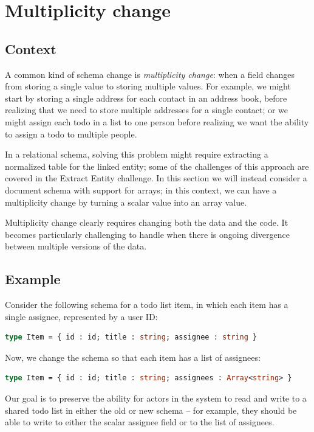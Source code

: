 \documentclass[english,submission]{programming}
\begin{document}
\section{Multiplicity change}

\subsection{Context}

A common kind of schema change is \textit{multiplicity change}: when a field changes from storing a single value to storing multiple values. For example, we might start by storing a single address for each contact in an address book, before realizing that we need to store multiple addresses for a single contact; or we might assign each todo in a list to one person before realizing we want the ability to assign a todo to multiple people.

In a relational schema, solving this problem might require extracting a normalized table for the linked entity; some of the challenges of this approach are covered in the Extract Entity challenge. In this section we will instead consider a document schema with support for arrays; in this context, we can have a multiplicity change by turning a scalar value into an array value.

Multiplicity change clearly requires changing both the data and the code. It becomes particularly challenging to handle when there is ongoing divergence between multiple versions of the data.

\subsection{Example}

Consider the following schema for a todo list item, in which each item has a single assignee, represented by a user ID:

\begin{lstlisting}[language=ml]
type Item = { id : id; title : string; assignee : string }
\end{lstlisting}

Now, we change the schema so that each item has a list of assignees:

\begin{lstlisting}[language=ml]
type Item = { id : id; title : string; assignees : Array<string> }
\end{lstlisting}

Our goal is to preserve the ability for actors in the system to read and write to a shared todo list in either the old or new schema -- for example, they should be able to write to either the scalar assignee field or to the list of assignees.
\end{document}
